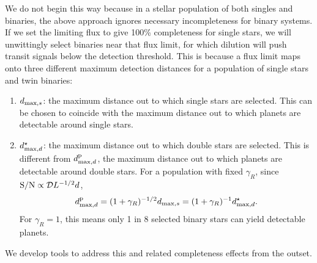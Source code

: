 \documentclass{emulateapj}
\begin{document}
We do not begin this way because in a stellar population of both singles and 
binaries, the above approach ignores necessary incompleteness for 
binary systems.
If we set the limiting flux to give 100\% completeness for single stars, we 
will unwittingly select binaries near that flux limit, for which dilution 
will push transit signals below the detection threshold.
This is because a flux limit maps onto three different maximum 
detection distances for a population of single stars and twin binaries:
\begin{enumerate}
\item $d_{{\rm max},s}$: the maximum distance out to which single stars are
  selected. This can be chosen to coincide with the maximum distance out to
  which planets are detectable around single stars.
%
\item $d_{{\rm max},d}^\star$: the maximum distance out to which double stars
  are selected. This is different from $d_{{\rm max},d}^{\rm p}$, the maximum
  distance out to which planets are detectable around double stars. For a 
  population with fixed  $\gamma_R$, since ${\rm S/N} \propto \mathcal{D} 
  L^{-1/2} d$,
  \begin{equation}
    d_{{\rm max},d}^{\rm p} = (1 + \gamma_R)^{-1/2} d_{{\rm max},s} = 
    (1 + \gamma_R)^{-1} d_{{\rm max},d}^\star.
  \end{equation}
  For $\gamma_R = 1$, this means only 1 in 8 selected binary stars can yield
  detectable planets.
\end{enumerate}
We develop tools to address this and related completeness effects from the 
outset.
\end{document}
